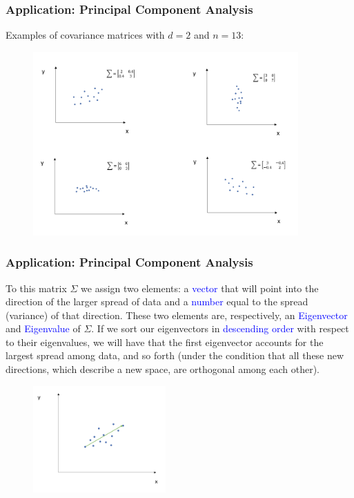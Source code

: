 \documentclass[11pt,aspectratio=169]{beamer}
\begin{document}
\begin{frame}
\frametitle{Application: Principal Component Analysis}
\begin{small}
\vskip 12pt
Examples of covariance matrices with $d=2$ and $n=13$:
\end{small}
\begin{figure}
\includegraphics[width=4in]{img/covariance} 
\end{figure}
\end{frame}


\begin{frame}
\frametitle{Application: Principal Component Analysis}
\begin{small}
To this matrix $\Sigma$ we assign two elements: a \textcolor{blue}{vector} that will point into the direction of the larger spread of data and a \textcolor{blue}{number} equal to the spread (variance) of that direction. These two elements are, respectively, an \textcolor{blue}{Eigenvector} and \textcolor{blue}{Eigenvalue} of  $\Sigma$.
If we sort our eigenvectors in \textcolor{blue}{descending order} with respect to their eigenvalues, we will have that the first eigenvector accounts for the largest spread among data, and so forth (under the condition that all these new directions, which describe a new space, are orthogonal among each other).
\end{small}
\begin{figure}
\includegraphics[width=2in]{img/eigenvalue} 
\end{figure}
\end{frame}
\end{document}
